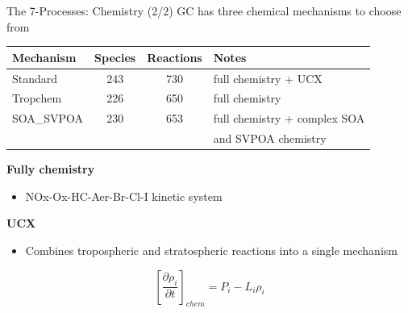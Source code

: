 \documentclass[10pt]{beamer}
\begin{document}
\begin{frame}[fragile]{The 7-Processes: Chemistry (2/2)}
    GC has three chemical mechanisms to choose from
    
    \small
    \begin{table}[]
    \begin{tabular}{lccl}
        \hline
        \textbf{Mechanism} & \textbf{Species} & \textbf{Reactions} & \textbf{Notes} \\ 
        \hline
        Standard & 243 & 730 & full chemistry + UCX \\ 
        Tropchem & 226 & 650 & full chemistry \\ 
        SOA\_SVPOA & 230 & 653 & full chemistry + complex SOA \\
         & & & and SVPOA chemistry \\ 
        \hline
    \end{tabular}
    \end{table}
    \begin{minipage}[c]{0.6\textwidth}
        \normalsize
        \textbf{Fully chemistry}
        \begin{itemize}
            \item NOx-Ox-HC-Aer-Br-Cl-I kinetic system
        \end{itemize}
        
        \textbf{UCX}
        \begin{itemize}
            \item Combines tropospheric and stratospheric reactions into a single mechanism
        \end{itemize}
    \end{minipage}
    \begin{minipage}[c]{0.34\textwidth}
        $$
            \left[ \frac{\partial \rho_i}{\partial t} \right]_{chem} = P_i - L_i \rho_i
        $$
    \end{minipage}
\end{frame}
\end{document}
